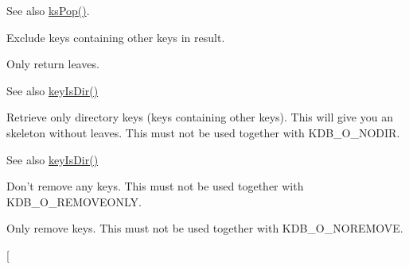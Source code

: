 \begin{Desc}
\begin{description}
\begin{DoxySeeAlso}{See also}
\hyperlink{group__keyset_gae42530b04defb772059de0600159cf69}{ksPop()}. 
\end{DoxySeeAlso}
\item[{\em 
\hypertarget{group__kdb_gga98a3d6a4016c9dad9cbd1a99a9c2a45aa1a70738b2126badb8db7b012c8a1c610}{
KDB\_\-O\_\-NODIR}
\label{group__kdb_gga98a3d6a4016c9dad9cbd1a99a9c2a45aa1a70738b2126badb8db7b012c8a1c610}
}]Exclude keys containing other keys in result.

Only return leaves.

\begin{DoxySeeAlso}{See also}
\hyperlink{group__keytest_gac0a10c602d52a35f81347e8a32312017}{keyIsDir()} 
\end{DoxySeeAlso}
\item[{\em 
\hypertarget{group__kdb_gga98a3d6a4016c9dad9cbd1a99a9c2a45aa131e99d60253d0b887a1e5886f8aa96c}{
KDB\_\-O\_\-DIRONLY}
\label{group__kdb_gga98a3d6a4016c9dad9cbd1a99a9c2a45aa131e99d60253d0b887a1e5886f8aa96c}
}]Retrieve only directory keys (keys containing other keys). This will give you an skeleton without leaves. This must not be used together with KDB\_\-O\_\-NODIR. \begin{DoxySeeAlso}{See also}
\hyperlink{group__keytest_gac0a10c602d52a35f81347e8a32312017}{keyIsDir()} 
\end{DoxySeeAlso}
\item[{\em 
\hypertarget{group__kdb_gga98a3d6a4016c9dad9cbd1a99a9c2a45aa7649f575c2eb0adeaf2c9173ae16e0e6}{
KDB\_\-O\_\-NOREMOVE}
\label{group__kdb_gga98a3d6a4016c9dad9cbd1a99a9c2a45aa7649f575c2eb0adeaf2c9173ae16e0e6}
}]Don't remove any keys. This must not be used together with KDB\_\-O\_\-REMOVEONLY. \item[{\em 
\hypertarget{group__kdb_gga98a3d6a4016c9dad9cbd1a99a9c2a45aaf6ed09cee8aa8cf0d6a0e318a7105440}{
KDB\_\-O\_\-REMOVEONLY}
\label{group__kdb_gga98a3d6a4016c9dad9cbd1a99a9c2a45aaf6ed09cee8aa8cf0d6a0e318a7105440}
}]Only remove keys. This must not be used together with KDB\_\-O\_\-NOREMOVE. \item[{\em 
}
\end{description}
\end{Desc}
